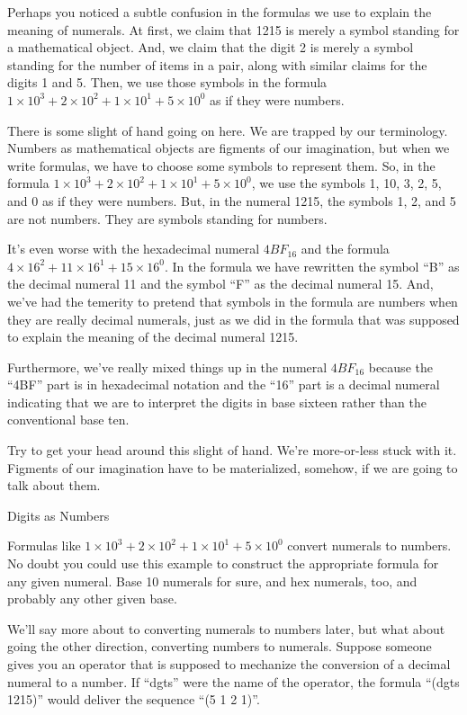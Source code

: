 \begin{aside}
Perhaps you noticed a subtle confusion in the formulas we use
to explain the meaning of numerals. At first, we claim that
1215 is merely a symbol standing for a mathematical object.
And, we claim that the digit 2 is merely a symbol standing
for the number of items in a pair, along with similar
claims for the digits 1 and 5. Then, we use those symbols
in the formula $1 \times 10^3 + 2 \times 10^2 + 1 \times 10^1 + 5 \times 10^0$
as if they were numbers.

There is some slight of hand going on here.
We are trapped by our terminology.
Numbers as mathematical objects are figments of our imagination,
but when we write formulas, we have to choose some symbols to
represent them.
So, in the formula $1 \times 10^3 + 2 \times 10^2 + 1 \times 10^1 + 5 \times 10^0$,
we use the symbols 1, 10, 3, 2, 5, and 0 as if they were numbers.
But, in the numeral 1215, the symbols 1, 2, and 5 are not numbers.
They are symbols standing for numbers.

It's even worse with the hexadecimal numeral $4BF_{16}$
and the formula $4 \times 16^2 + 11 \times 16^1 + 15 \times 16^0$.
In the formula we have rewritten the symbol ``B'' as the decimal numeral 11
and the symbol ``F'' as the decimal numeral 15.
And, we've had the temerity to pretend that symbols
in the formula are numbers when they are really decimal numerals,
just as we did in the formula that was supposed to explain
the meaning of the decimal numeral 1215.

Furthermore, we've really mixed things up in the numeral
$4BF_{16}$ because the ``4BF'' part is in hexadecimal notation
and the ``16'' part is a decimal numeral indicating that we are
to interpret the digits in base sixteen rather than the conventional base ten.

Try to get your head around this slight of hand.
We're more-or-less stuck with it. Figments of our imagination have
to be materialized, somehow, if we are going to talk about them.
\caption{Digits as Numbers}
\label{aside-digits-as-numbers}
\end{aside}

Formulas like $1 \times 10^3 + 2 \times 10^2 + 1 \times 10^1 + 5 \times 10^0$
convert numerals to numbers.
No doubt you could use this example to construct the appropriate formula
for any given numeral. Base 10 numerals for sure, and hex numerals, too,
and probably any other given base.

We'll say more about to converting numerals to numbers later,
but what about going the other direction, converting
numbers to numerals.
Suppose someone gives you an operator that is supposed to
mechanize the conversion of a decimal numeral to a number.
If ``dgts'' were the name of the operator, the formula
``(dgts 1215)'' would deliver the sequence ``(5 1 2 1)''.

